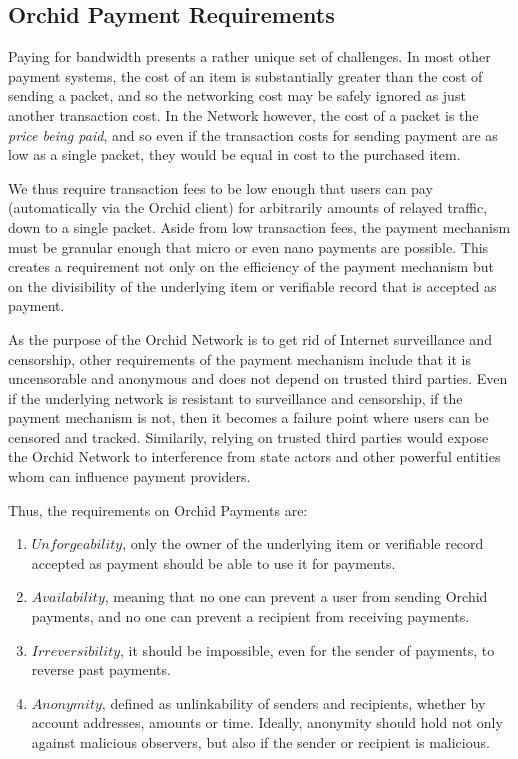 \subsection{Orchid Payment Requirements}
\label{sec:paymentreqs}

Paying for bandwidth presents a rather unique set of challenges. In most other payment systems, the cost of an item is substantially greater than the cost of sending a packet, and so the networking cost may be safely ignored as just another transaction cost. In the \Orchid{} Network however, the cost of a packet is the \emph{price being paid}, and so even if the transaction costs for sending payment are as low as a single packet, they would be equal in cost to the purchased item.

We thus require transaction fees to be low enough that users can pay (automatically via the Orchid client) for arbitrarily amounts of relayed traffic, down to a single packet. Aside from low transaction fees, the payment mechanism must be granular enough that micro or even nano payments are possible. This creates a requirement not only on the efficiency of the payment mechanism but on the divisibility of the underlying item or verifiable record that is accepted as payment.

As the purpose of the Orchid Network is to get rid of Internet surveillance and censorship, other requirements of the payment mechanism include that it is uncensorable and anonymous and does not depend on trusted third parties. Even if the underlying network is resistant to surveillance and censorship, if the payment mechanism is not, then it becomes a failure point where users can be censored and tracked. Similarily, relying on trusted third parties would expose the Orchid Network to interference from state actors and other powerful entities whom can influence payment providers.

Thus, the requirements on Orchid Payments are:
\begin{enumerate}
\item $Unforgeability$, only the owner of the underlying item or verifiable record accepted as payment should be able to use it for payments.
\item $Availability$, meaning that no one can prevent a user from sending Orchid payments, and no one can prevent a recipient from receiving payments.
\item $Irreversibility$, it should be impossible, even for the sender of payments, to reverse past payments.
\item $Anonymity$, defined as unlinkability of senders and recipients, whether by account addresses, amounts or time. Ideally, anonymity should hold not only against malicious observers, but also if the sender or recipient is malicious.
\end{enumerate}

